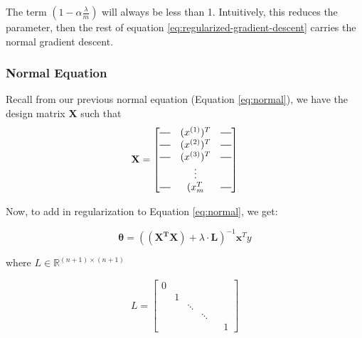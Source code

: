         The term $(1-\alpha \frac{\lambda}{m})$ will always be less than 1. Intuitively, this reduces the parameter, then the rest of equation \ref{eq:regularized-gradient-descent} carries the normal gradient descent.
        
        \subsubsection{Normal Equation}

        Recall from our previous normal equation (Equation \ref{eq:normal}), we have the design matrix \textbf{X} such that
            \[
            \mathbf{X} = \begin{bmatrix}
                \horzbar & (x^{(1)})^T & \horzbar \\
                \horzbar & (x^{(2)})^T & \horzbar \\
                \horzbar & (x^{(3)})^T & \horzbar \\
                         & \vdots      &          \\
                \horzbar & (x_{m}^{T}  & \horzbar \\
             \end{bmatrix}
            \]

            Now, to add in regularization to Equation \ref{eq:normal}, we get:

                 \begin{equation}
                     \boxed{
                     \mathbf{\theta} = (\mathbf{(X^TX)}+ \lambda\cdot\mathbf{L})^{-1} \mathbf{x}^Ty
                    }
                     \label{eq:regularized-normal}
                 \end{equation}

                 where $ L \in \mathbb{R}^{(n+1)\times(n+1)}$ 

                \begin{equation}
                    L = \begin{bmatrix}
                            0 & & & \\
                            & 1 & & \\
                            & &  \ddots & & \\
                            & &  & \ddots & \\
                            & & & & & 1 
                        \end{bmatrix}

                    \label{eq:regularized-L}
                \end{equation}
                
